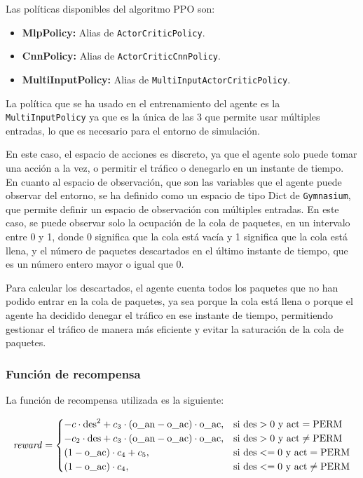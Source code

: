 Las políticas disponibles del algoritmo PPO son:
\begin{itemize}
    \item \textbf{MlpPolicy:} Alias de \texttt{ActorCriticPolicy}.
    \item \textbf{CnnPolicy:} Alias de \texttt{ActorCriticCnnPolicy}.
    \item \textbf{MultiInputPolicy:} Alias de \texttt{MultiInputActorCriticPolicy}.
\end{itemize}
La política que se ha usado en el entrenamiento del agente es la \texttt{MultiInputPolicy} ya que es la única de las 3 que permite usar múltiples entradas, lo que es necesario para el entorno de simulación.

En este caso, el espacio de acciones es discreto, ya que el agente solo puede tomar una acción a la vez, o permitir el tráfico o denegarlo en un instante de tiempo. En cuanto al espacio de observación, que son las variables que el agente puede observar del entorno, se ha definido como un espacio de tipo Dict de \texttt{Gymnasium}, que permite definir un espacio de observación con múltiples entradas. En este caso, se puede observar solo la ocupación de la cola de paquetes, en un intervalo entre 0 y 1, donde 0 significa que la cola está vacía y 1 significa que la cola está llena, y el número de paquetes descartados en el último instante de tiempo, que es un número entero mayor o igual que 0.

Para calcular los descartados, el agente cuenta todos los paquetes que no han podido entrar en la cola de paquetes, ya sea porque la cola está llena o porque el agente ha decidido denegar el tráfico en ese instante de tiempo, permitiendo gestionar el tráfico de manera más eficiente y evitar la saturación de la cola de paquetes.

\subsubsection{Función de recompensa}
La función de recompensa utilizada es la siguiente: 

\[
\text{\textit{reward}} = 
\begin{cases}
    -c \cdot \text{des}^2 + c_3 \cdot (\text{o\_an} - \text{o\_ac}) \cdot \text{o\_ac}, & \text{si } \text{des} > 0 \text{ y } \text{act} = \text{PERM} \\
    -c_2 \cdot \text{des} + c_3 \cdot (\text{o\_an} - \text{o\_ac}) \cdot \text{o\_ac}, & \text{si } \text{des} > 0 \text{ y } \text{act} \ne \text{PERM} \\
    (1 - \text{o\_ac}) \cdot c_4 + c_5, & \text{si } \text{des} <= 0 \text{ y } \text{act} = \text{PERM} \\
    (1 - \text{o\_ac}) \cdot c_4, & \text{si } \text{des} <= 0 \text{ y } \text{act} \ne \text{PERM}
\end{cases}
\]

